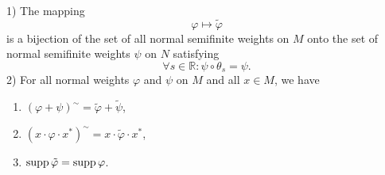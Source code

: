 \begin{lemma}\label{Chap2: lemma: 1}
    1) The mapping
    \[
        \varphi\mapsto \tilde{\varphi}
    \]
    is a bijection of the set of all normal semifinite weights on $M$ onto the set of normal semifinite weights $\psi$ on $N$ satisfying
    \begin{equation}\label{Chap2: eqn: 13}
        \forall s\in \mathbb{R}:\psi\circ \theta_s=\psi.
    \end{equation}
    2) For all normal weights $\varphi$ and $\psi$ on $M$ and all $x\in M$, we have
    \begin{enumerate}
        \item $(\varphi+\psi)^\sim=\tilde{\varphi}+\tilde{\psi}$,
        \item $(x\cdot \varphi\cdot x^*)^\sim=x\cdot \tilde{\varphi}\cdot x^*$,
        \item $\operatorname{supp} \tilde{\varphi}=\operatorname{supp} \varphi$.
    \end{enumerate}
\end{lemma}
